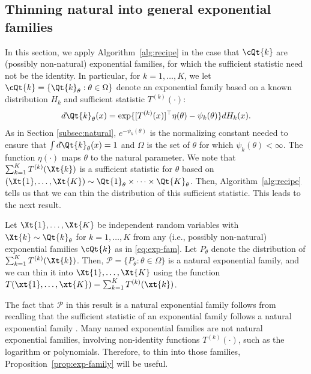 \documentclass[12pt]{article}
\begin{document}
\subsection{Thinning natural into general exponential families} 
\label{subsec:natural-to-general}


In this section, we apply Algorithm~\ref{alg:recipe} in the case that $\cQt{k}$ are (possibly non-natural) exponential families, for which the sufficient statistic need not be the identity. 
In particular, for $k=1,\ldots, K$, we let $\cQt{k}=\{\Qt{k}_\theta:\theta\in\Omega\}$ denote an exponential family based on a known distribution $H_k$ and sufficient statistic $T^{(k)}(\cdot)$:
\begin{equation}\label{eq:exp-fam}
d\Qt{k}_\theta(x)=\exp\{[T^{(k)}(x)]^\top\eta(\theta)-\psi_k(\theta)\}dH_k(x).
\end{equation}
As in Section \ref{subsec:natural}, $e^{-\psi_k(\theta)}$ is the normalizing constant needed to ensure that $\int d\Qt{k}_\theta(x)=1$ and $\Omega$ is the set of $\theta$ for which $\psi_k(\theta)<\infty$.  The function $\eta(\cdot)$ maps $\theta$ to the natural parameter.  We note that  $\sum_{k=1}^K T^{(k)}(\Xt{k})$ is a sufficient statistic for $\theta$ based on $(\Xt{1},\dots,\Xt{K})\sim \Qt{1}_\theta\times\cdots\times\Qt{K}_\theta$.   Then,  Algorithm~\ref{alg:recipe} tells us that we can thin the distribution of this sufficient statistic. This  leads to the next result.

\begin{proposition} \label{prop:exp-family}
Let $\Xt{1},\dots,\Xt{K}$ be independent random variables with $\Xt{k}\sim\Qt{k}_\theta$ for $k=1,\ldots,K$ from any (i.e., possibly non-natural) exponential families $\cQt{k}$ as in \eqref{eq:exp-fam}.
Let $P_\theta$ denote the distribution of $\sum_{k=1}^K T^{(k)}(\Xt{k})$. Then, $\mathcal P=\{P_\theta:\theta\in\Omega\}$ is a natural exponential family, and we can thin it  into $\Xt{1},\ldots,\Xt{K}$ using the function $T(\xt{1},\dots,\xt{K})=\sum_{k=1}^K T^{(k)}(\xt{k})$.
\end{proposition}
The fact that $\mathcal P$ in this result is a natural exponential family follows from recalling that the sufficient statistic of an exponential family follows a natural exponential family \citep[Lemma~2.7.2(i)]{lehmann2005testing}. 
Many named exponential families are not natural exponential families, involving non-identity functions $T^{(k)}(\cdot)$, such as the logarithm or polynomials.  Therefore, to thin into those families, Proposition~\ref{prop:exp-family} will be useful.
\end{document}
